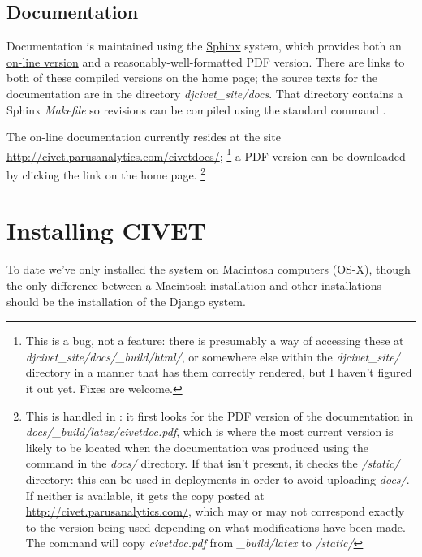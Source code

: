 \documentclass[letterpaper,10pt,english]{sphinxmanual}
\begin{document}
\section{Documentation}
\label{intro:documentation}
Documentation is maintained using the \href{http://http://sphinx-doc.org/}{Sphinx} system, which provides both an
\href{http://civet.parusanalytics.com/civetdocs/index.html}{on-line version} and a reasonably-well-formatted PDF version. There
are links to both of these compiled versions on the home page; the  source texts for the documentation are in the
directory \emph{djcivet\_site/docs}. That directory contains a Sphinx \emph{Makefile} so revisions can be compiled using the standard
command .

The on-line documentation currently resides at the site \href{http://civet.parusanalytics.com/civetdocs/}{http://civet.parusanalytics.com/civetdocs/}; \footnote{
This is a bug, not a feature: there is presumably a way of accessing these at \emph{djcivet\_site/docs/\_build/html/}, or
somewhere else within the \emph{djcivet\_site/} directory
in a manner that has them correctly rendered, but I haven't figured it out yet. Fixes are welcome.
} a PDF version can
be downloaded by clicking the  link on the home page. \footnote{
This is handled in : it first looks for the PDF version of the documentation in
\emph{docs/\_build/latex/civetdoc.pdf}, which is where the most current version is likely to be located when the
documentation was produced using the  command in the \emph{docs/} directory. If that isn't present,
it checks the \emph{/static/} directory: this can be used in deployments in order to avoid uploading  \emph{docs/}. If neither
is available, it gets the copy posted at \href{http://civet.parusanalytics.com/}{http://civet.parusanalytics.com/}, which may or may not correspond exactly to the
version being used depending on what modifications have been made. The command  will copy \emph{civetdoc.pdf} from
\emph{\_build/latex} to \emph{/static/}
}


\chapter{Installing CIVET}
\label{installing:installing-civet}\label{installing::doc}
To date we’ve only installed the system on Macintosh computers (OS-X), though
the only difference between a Macintosh installation and other
installations should be the installation of the Django system.
\end{document}
